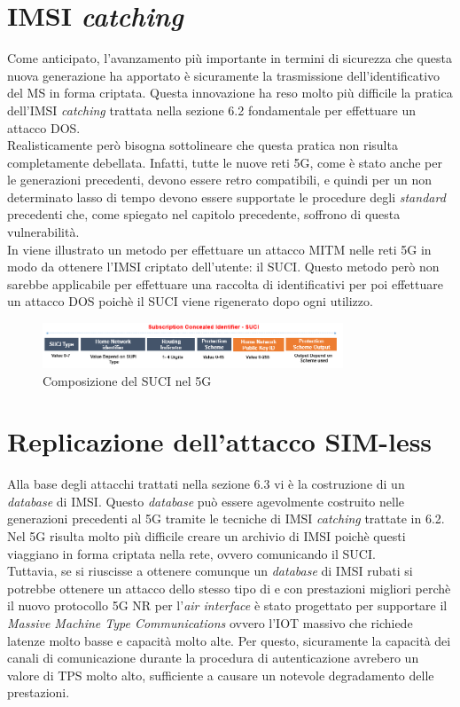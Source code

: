 \section{IMSI \textit{catching}}
Come anticipato, l'avanzamento più importante in termini di sicurezza che questa nuova generazione ha apportato è sicuramente la trasmissione dell'identificativo del MS in forma 
criptata. Questa innovazione ha reso molto più difficile la pratica dell'IMSI \textit{catching} trattata nella sezione 6.2 fondamentale per effettuare un attacco DOS.\\
Realisticamente però bisogna sottolineare che questa pratica non risulta completamente debellata. Infatti, tutte le nuove reti 5G, come è stato anche per le generazioni precedenti, devono 
essere retro compatibili, e quindi per un non determinato lasso di tempo devono essere supportate le procedure degli \textit{standard} precedenti che, come spiegato nel capitolo precedente, soffrono 
di questa vulnerabilità.\\
In \cite{suci-catch} viene illustrato un metodo per effettuare un attacco MITM nelle reti 5G in modo da ottenere l'IMSI criptato dell'utente: il SUCI. Questo metodo però non sarebbe applicabile per effettuare 
una raccolta di identificativi per poi effettuare un attacco DOS poichè il SUCI viene rigenerato dopo ogni utilizzo.
\begin{figure}[ht]
    \centering
    \includegraphics[width=0.8\textwidth]{images/5g-suci.png}
    \caption{Composizione del SUCI nel 5G}
\end{figure}

\section{Replicazione dell'attacco SIM-less}
Alla base degli attacchi trattati nella sezione 6.3 vi è la costruzione di un \textit{database} di IMSI. Questo \textit{database} può essere agevolmente costruito nelle generazioni precedenti al 5G 
tramite le tecniche di IMSI \textit{catching} trattate in 6.2. Nel 5G risulta molto più difficile creare un archivio di IMSI poichè questi viaggiano in forma criptata nella rete, ovvero comunicando il SUCI.\\
Tuttavia, se si riuscisse a ottenere comunque un \textit{database} di IMSI rubati si potrebbe ottenere un attacco dello stesso tipo di \cite{gsm-dos-simless} e \cite{umts-dos} con prestazioni migliori 
perchè il nuovo protocollo 5G NR\cite{5g-nr} per l'\textit{air interface} è stato progettato per supportare il \textit{Massive Machine Type Communications} ovvero l'IOT massivo che richiede latenze molto basse e capacità molto alte.
Per questo, sicuramente la capacità dei canali di comunicazione durante la procedura di autenticazione avrebero un valore di TPS molto alto, sufficiente a causare un notevole degradamento delle prestazioni.

